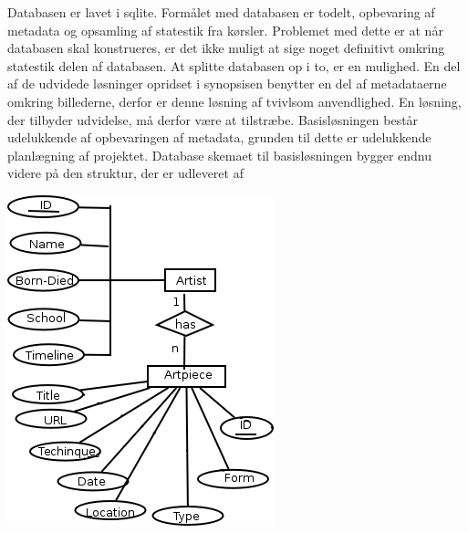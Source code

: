 Databasen er lavet i sqlite.
Formålet med databasen er todelt, opbevaring af metadata og opsamling af statestik fra kørsler.
Problemet med dette er at når databasen skal konstrueres, er det ikke muligt at sige noget definitivt omkring statestik delen af databasen.
At splitte databasen op i to, er en mulighed. 
En del af de udvidede løsninger opridset i synopsisen benytter en del af metadataerne omkring billederne, derfor er denne løsning af tvivlsom anvendlighed.
En løsning, der tilbyder udvidelse, må derfor være at tilstræbe.
Basisløsningen består udelukkende af opbevaringen af metadata, grunden til dette er udelukkende planlægning af projektet.
Database skemaet til basisløsningen bygger endnu videre på den struktur,
der er udleveret af \cite{wgahu}

\newpage
\includegraphics[scale=0.9]{afsnit/vores_implementation/billeder/ER}
